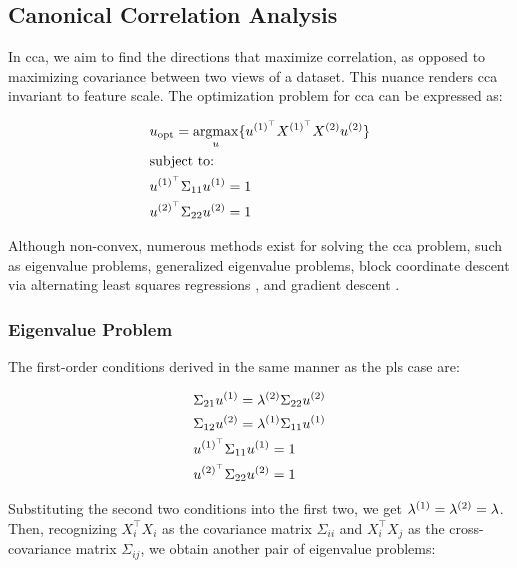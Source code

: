 \subsection{Canonical Correlation Analysis}\label{sec:cca}

In \acrshort{cca}, we aim to find the directions that maximize correlation, as opposed to maximizing covariance between two \gls{views} of a dataset.
This nuance renders \acrshort{cca} invariant to feature scale. The optimization problem for \acrshort{cca} can be expressed as:

\begin{align}
     & u_{\text{opt}}=\underset{u}{\mathrm{argmax}}\{ u^{(1)^{\top}}X^{(1)^{\top}}X^{(2)}u^{(2)} \} \\
     & \text{subject to:} \notag                                                                \\
     & u^{(1)^{\top}}\Sigma_{11}u^{(1)}=1 \notag                                                  \\
     & u^{(2)^{\top}}\Sigma_{22}u^{(2)}=1 \notag
\end{align}

Although non-convex, numerous methods exist for solving the \acrshort{cca} problem, such as eigenvalue problems, generalized eigenvalue problems, block coordinate descent via alternating least squares regressions \citep{golub1995canonical,sun2008least} , and gradient descent \citep{via2007learning}.

\subsubsection{Eigenvalue Problem}

The first-order conditions derived in the same manner as the \acrshort{pls} case are:

\begin{align}\label{CCA:FOCs}
     & \Sigma_{21}u^{(1)}=\lambda^{(2)} \Sigma_{22}u^{(2)} \\
     & \Sigma_{12}u^{(2)}=\lambda^{(1)} \Sigma_{11}u^{(1)} \\
     & u^{(1)^{\top}}\Sigma_{11}u^{(1)}=1                       \\
     & u^{(2)^{\top}}\Sigma_{22}u^{(2)}=1
\end{align}

Substituting the second two conditions into the first two, we get \(\lambda^{(1)}=\lambda^{(2)}=\lambda\). Then, recognizing \(X_i^{\top}X_i\) as the covariance matrix \(\Sigma_{ii}\) and \(X_i^{\top}X_j\) as the cross-covariance matrix \(\Sigma_{ij}\), we obtain another pair of eigenvalue problems:

